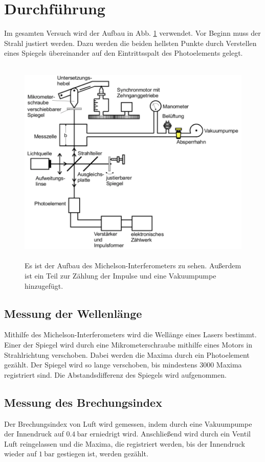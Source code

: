 \section{Durchführung}
\label{sec:Durchführung}
Im gesamten Versuch wird der Aufbau in Abb. \ref{fig:aufbau} verwendet.
\newline
Vor Beginn muss der Strahl justiert werden. Dazu werden die beiden hellsten
Punkte durch Verstellen eines Spiegels übereinander auf den Eintrittsspalt des 
Photoelements gelegt.

\begin{figure}
    \centering
    \includegraphics[width=12cm, height=10cm]{build/aufbau.png}
    \caption{Es ist der Aufbau des Michelson-Interferometers zu sehen.
    Außerdem ist ein Teil zur Zählung der Impulse und eine Vakuumpumpe
    hinzugefügt. \cite{V401}}
    \label{fig:aufbau}
\end{figure}

\subsection{Messung der Wellenlänge}
Mithilfe des Michelson-Interferometers wird die Wellänge eines Lasers bestimmt.
Einer der Spiegel wird durch eine Mikrometerschraube mithilfe eines Motors in 
Strahlrichtung verschoben. Dabei werden die Maxima durch ein Photoelement gezählt.
Der Spiegel wird so lange verschoben, bis mindestens $\num{3000}$ Maxima registriert
sind. Die Abstandsdifferenz des Spiegels wird aufgenommen.

\subsection{Messung des Brechungsindex}
Der Brechungsindex von Luft wird gemessen, indem durch eine Vakuumpumpe der Innendruck
auf $\SI{0.4}{\bar}$ erniedrigt wird. Anschließend wird durch ein Ventil Luft
reingelassen und die Maxima, die registriert werden, bis der Innendruck wieder auf
$\SI{1}{\bar}$ gestiegen ist, werden gezählt.